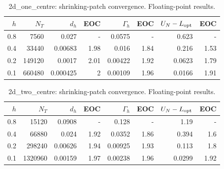 \begin{table}[htbp]
\centering\small
\begin{tabular}{rrrrrrrr}
\hline
$h$ & $N_T$ & $d_h$ & EOC & $\Gamma_h$ & EOC & $U_N-L_{\rm opt}$ & EOC \\
\hline
0.8 & 7560 & 0.027 & - & 0.0575 & - & 0.623 & - \\
0.4 & 33440 & 0.00683 & 1.98 & 0.016 & 1.84 & 0.216 & 1.53 \\
0.2 & 149120 & 0.0017 & 2.01 & 0.00422 & 1.92 & 0.0623 & 1.79 \\
0.1 & 660480 & 0.000425 & 2 & 0.00109 & 1.96 & 0.0166 & 1.91 \\
\hline
\end{tabular}
\caption{2d\_one\_centre: shrinking-patch convergence. Floating-point results.}
\end{table}

\begin{table}[htbp]
\centering\small
\begin{tabular}{rrrrrrrr}
\hline
$h$ & $N_T$ & $d_h$ & EOC & $\Gamma_h$ & EOC & $U_N-L_{\rm opt}$ & EOC \\
\hline
0.8 & 15120 & 0.0908 & - & 0.128 & - & 1.19 & - \\
0.4 & 66880 & 0.024 & 1.92 & 0.0352 & 1.86 & 0.394 & 1.6 \\
0.2 & 298240 & 0.00626 & 1.94 & 0.00925 & 1.93 & 0.113 & 1.8 \\
0.1 & 1320960 & 0.00159 & 1.97 & 0.00238 & 1.96 & 0.0299 & 1.92 \\
\hline
\end{tabular}
\caption{2d\_two\_centre: shrinking-patch convergence. Floating-point results.}
\end{table}

